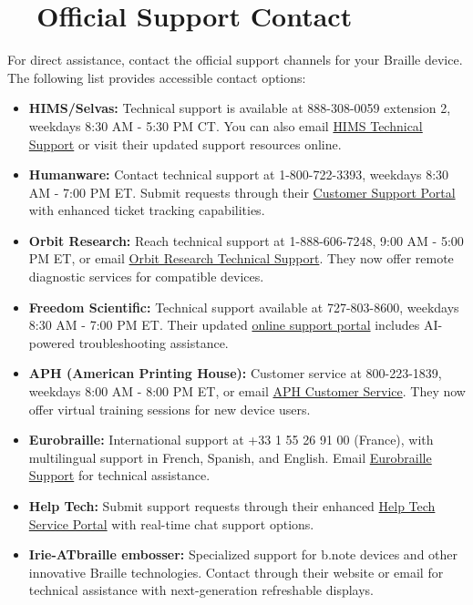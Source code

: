 \section{~~Official Support Contact}
\label{app2:report2}
For direct assistance, contact the official support channels for your Braille device. The following list provides accessible contact options:

\begin{itemize}
	\item \textbf{HIMS/Selvas:} Technical support is available at 888-308-0059 extension 2, weekdays 8:30 AM - 5:30 PM CT. You can also email \href{mailto:support@hims-inc.com}{HIMS Technical Support} or visit their updated support resources online.
	\item \textbf{Humanware:} Contact technical support at 1-800-722-3393, weekdays 8:30 AM - 7:00 PM ET. Submit requests through their \href{https://store.humanware.com/hus/contact/}{Customer Support Portal} with enhanced ticket tracking capabilities.
	\item \textbf{Orbit Research:} Reach technical support at 1-888-606-7248, 9:00 AM - 5:00 PM ET, or email \href{mailto:techsupport@orbitresearch.com}{Orbit Research Technical Support}. They now offer remote diagnostic services for compatible devices.
	\item \textbf{Freedom Scientific:} Technical support available at 727-803-8600, weekdays 8:30 AM - 7:00 PM ET. Their updated \href{https://support.freedomscientific.com/Forms/TechSupport}{online support portal} includes AI-powered troubleshooting assistance.
	\item \textbf{APH (American Printing House):} Customer service at 800-223-1839, weekdays 8:00 AM - 8:00 PM ET, or email \href{mailto:cs@aph.org}{APH Customer Service}. They now offer virtual training sessions for new device users.
	\item \textbf{Eurobraille:} International support at +33 1 55 26 91 00 (France), with multilingual support in French, Spanish, and English. Email \href{mailto:contact@eurobraille.fr}{Eurobraille Support} for technical assistance.
	\item \textbf{Help Tech:} Submit support requests through their enhanced \href{https://www.help-tech.com/contact}{Help Tech Service Portal} with real-time chat support options.
	\item \textbf{Irie-ATbraille embosser:} Specialized support for b.note devices and other innovative Braille technologies. Contact through their website or email for technical assistance with next-generation refreshable displays.
\end{itemize}

